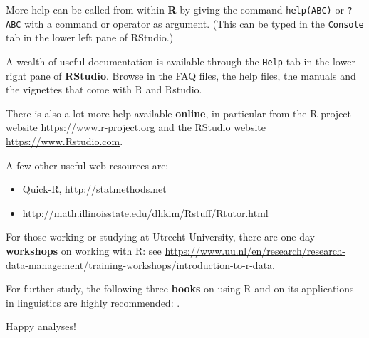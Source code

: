 \documentclass[]{book}
\begin{document}
More help can be called from within \textbf{R} by giving the command
\texttt{help(ABC)} or \texttt{?ABC} with a
command or operator as argument.
(This can be typed in the \texttt{Console} tab in the lower left pane of RStudio.)

A wealth of useful documentation is available through the \texttt{Help} tab
in the lower right pane of \textbf{RStudio}. Browse in the FAQ files, the help files, the
manuals and the vignettes that come with R and Rstudio.

There is also a lot more help available \textbf{online}, in particular
from the R project website \url{https://www.r-project.org}
and the RStudio website \url{https://www.Rstudio.com}.

A few other useful web resources are:

\begin{itemize}
\item
  Quick-R, \url{http://statmethods.net}
\item
  \url{http://math.illinoisstate.edu/dhkim/Rstuff/Rtutor.html}
\end{itemize}

For those working or studying at Utrecht University,
there are one-day \textbf{workshops} on working with R: see
\url{https://www.uu.nl/en/research/research-data-management/training-workshops/introduction-to-r-data}.

For further study, the following three \textbf{books} on using R and on its
applications in linguistics are highly recommended:
\citep{baay08, john08, adler10}.

Happy analyses!


\end{document}
